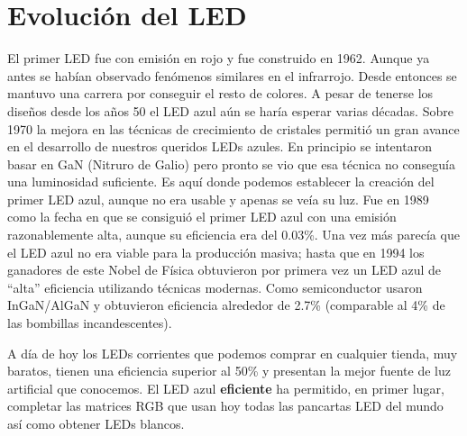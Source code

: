 \section{Evolución del LED}

El primer LED fue con emisión en rojo y fue construido en 1962. Aunque
ya antes se habían observado fenómenos similares en el
infrarrojo. Desde entonces se mantuvo una carrera por conseguir el
resto de colores. A pesar de tenerse los diseños desde los años 50 el
LED azul aún se haría esperar varias décadas. Sobre 1970 la mejora en
las técnicas de crecimiento de cristales permitió un gran avance en el
desarrollo de nuestros queridos LEDs azules. En principio se
intentaron basar en GaN (Nitruro de Galio) pero pronto se vio que esa
técnica no conseguía una luminosidad suficiente. Es aquí donde podemos
establecer la creación del primer LED azul, aunque no era usable y
apenas se veía su luz. Fue en 1989 como la fecha en que se consiguió
el primer LED azul con una emisión razonablemente alta, aunque su
eficiencia era del 0.03\%.  Una vez más parecía que el LED azul no era
viable para la producción masiva; hasta que en 1994 los ganadores de
este Nobel de Física obtuvieron por primera vez un LED azul de “alta”
eficiencia utilizando técnicas modernas. Como semiconductor usaron
InGaN/AlGaN y obtuvieron eficiencia alrededor de 2.7\% (comparable al
4\% de las bombillas incandescentes).

A día de hoy los LEDs corrientes que podemos comprar en cualquier
tienda, muy baratos, tienen una eficiencia superior al 50\% y
presentan la mejor fuente de luz artificial que conocemos. El LED azul
{\bf eficiente} ha permitido, en primer
lugar, completar las matrices RGB que usan hoy todas las pancartas LED
del mundo así como obtener LEDs blancos.


